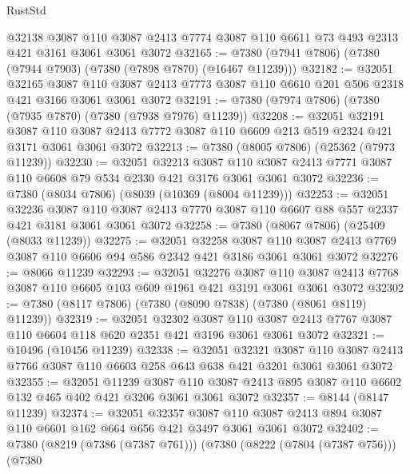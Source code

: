 \begin{lexlean}{RustStd}
\begin{coremodule}
    @32138
    @3087
    @110
    @3087
    @2413
    @7774
    @3087
    @110
    @6611
    @73
    @493
    @2313
    @421
    @3161
    @3061
    @3061
    @3072
@32165 := @7380 (@7941 @7806) (@7380 (@7944 @7903) (@7380 (@7898 @7870) (@16467 @11239)))
@32182 := @32051
    @32165
    @3087
    @110
    @3087
    @2413
    @7773
    @3087
    @110
    @6610
    @201
    @506
    @2318
    @421
    @3166
    @3061
    @3061
    @3072
@32191 := @7380 (@7974 @7806) (@7380 (@7935 @7870) (@7380 (@7938 @7976) @11239))
@32208 := @32051
    @32191
    @3087
    @110
    @3087
    @2413
    @7772
    @3087
    @110
    @6609
    @213
    @519
    @2324
    @421
    @3171
    @3061
    @3061
    @3072
@32213 := @7380 (@8005 @7806) (@25362 (@7973 @11239))
@32230 := @32051
    @32213
    @3087
    @110
    @3087
    @2413
    @7771
    @3087
    @110
    @6608
    @79
    @534
    @2330
    @421
    @3176
    @3061
    @3061
    @3072
@32236 := @7380 (@8034 @7806) (@8039 (@10369 (@8004 @11239)))
@32253 := @32051
    @32236
    @3087
    @110
    @3087
    @2413
    @7770
    @3087
    @110
    @6607
    @88
    @557
    @2337
    @421
    @3181
    @3061
    @3061
    @3072
@32258 := @7380 (@8067 @7806) (@25409 (@8033 @11239))
@32275 := @32051
    @32258
    @3087
    @110
    @3087
    @2413
    @7769
    @3087
    @110
    @6606
    @94
    @586
    @2342
    @421
    @3186
    @3061
    @3061
    @3072
@32276 := @8066 @11239
@32293 := @32051
    @32276
    @3087
    @110
    @3087
    @2413
    @7768
    @3087
    @110
    @6605
    @103
    @609
    @1961
    @421
    @3191
    @3061
    @3061
    @3072
@32302 := @7380 (@8117 @7806) (@7380 (@8090 @7838) (@7380 (@8061 @8119) @11239))
@32319 := @32051
    @32302
    @3087
    @110
    @3087
    @2413
    @7767
    @3087
    @110
    @6604
    @118
    @620
    @2351
    @421
    @3196
    @3061
    @3061
    @3072
@32321 := @10496 (@10456 @11239)
@32338 := @32051
    @32321
    @3087
    @110
    @3087
    @2413
    @7766
    @3087
    @110
    @6603
    @258
    @643
    @638
    @421
    @3201
    @3061
    @3061
    @3072
@32355 := @32051
    @11239
    @3087
    @110
    @3087
    @2413
    @895
    @3087
    @110
    @6602
    @132
    @465
    @402
    @421
    @3206
    @3061
    @3061
    @3072
@32357 := @8144 (@8147 @11239)
@32374 := @32051
    @32357
    @3087
    @110
    @3087
    @2413
    @894
    @3087
    @110
    @6601
    @162
    @664
    @656
    @421
    @3497
    @3061
    @3061
    @3072
@32402 := @7380
    (@8219 (@7386 (@7387 @761)))
    (@7380
      (@8222 (@7804 (@7387 @756)))
      (@7380

\end{coremodule}
\end{lexlean}
